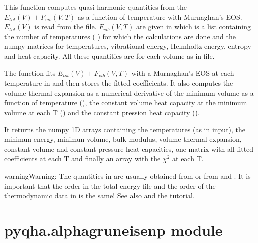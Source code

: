 \documentclass[letterpaper,10pt,english]{sphinxmanual}
\begin{document}
\begin{fulllineitems}
This function computes quasi-harmonic quantities from the 
\(E_{tot}(V)+F_{vib}(V,T)\) as a function of temperature with Murnaghan's
EOS. \(E_{tot}(V)\) is read from the  file. \(F_{vib}(V,T)\)
are given in  which is a list containing the number of temperatures
(  ) for which the calculations are done and the numpy matrices for 
temperatures, vibrational energy, Helmholtz energy, entropy and
heat capacity. All these quantities are for each volume as in  file.

The function fits \(E_{tot}(V)+F_{vib}(V,T)\) with a Murnaghan's EOS
at each temperature in  and then stores the fitted coefficients.
It also computes the volume thermal expansion as a numerical derivative of
the minimum volume as a function of temperature (), the
constant volume heat capacity at the minimum volume at each T
() and the constant pression heat capacity ().

It returns the numpy 1D arrays containing the temperatures (as in input), the
minimun energy, minimun volume, bulk modulus, volume thermal expansion, constant
volume and constant pressure heat capacities, one matrix with all fitted 
coefficients at each T and finally an array with the \(\chi^2\) at each T.

\begin{sphinxadmonition}{warning}{Warning:}
The quantities in  are usually obtained from 
or from  and . It is
important that the order in the total energy file  and the order of
the thermodynamic data in  is the same!  See also  and 
the tutorial.
\end{sphinxadmonition}

\end{fulllineitems}



\section{pyqha.alphagruneisenp module}
\label{pyqha:module-pyqha.alphagruneisenp}\label{pyqha:pyqha-alphagruneisenp-module}
\end{document}
